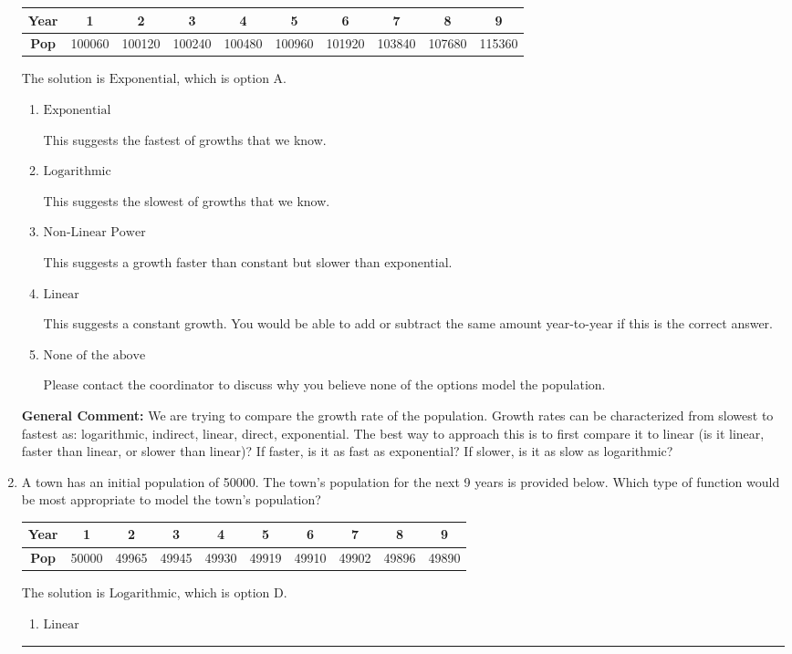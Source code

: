 \documentclass{extbook}[14pt]
\newcommand{\litem}[1]{\item #1

\rule{\textwidth}{0.4pt}}
\begin{document}
\begin{enumerate}
{\begin{tabular}{c|c|c|c|c|c|c|c|c|c}
\textbf{Year} &1 &2 &3 &4 &5 &6 &7 &8 &9\tabularnewline \hline
\textbf{Pop} &100060 &100120 &100240 &100480 &100960 &101920 &103840 &107680 &115360\end{tabular}The solution is \( \text{Exponential} \), which is option A.\begin{enumerate}[label=\Alph*.]
\item \( \text{Exponential} \)

This suggests the fastest of growths that we know.
\item \( \text{Logarithmic} \)

This suggests the slowest of growths that we know.
\item \( \text{Non-Linear Power} \)

This suggests a growth faster than constant but slower than exponential.
\item \( \text{Linear} \)

This suggests a constant growth. You would be able to add or subtract the same amount year-to-year if this is the correct answer.
\item \( \text{None of the above} \)

Please contact the coordinator to discuss why you believe none of the options model the population.
\end{enumerate}

\textbf{General Comment:} We are trying to compare the growth rate of the population. Growth rates can be characterized from slowest to fastest as: logarithmic, indirect, linear, direct, exponential. The best way to approach this is to first compare it to linear (is it linear, faster than linear, or slower than linear)? If faster, is it as fast as exponential? If slower, is it as slow as logarithmic?
}
\litem{
A town has an initial population of 50000. The town's population for the next 9 years is provided below. Which type of function would be most appropriate to model the town's population?


\begin{tabular}{c|c|c|c|c|c|c|c|c|c}
\textbf{Year} &1 &2 &3 &4 &5 &6 &7 &8 &9\tabularnewline \hline
\textbf{Pop} &50000 &49965 &49945 &49930 &49919 &49910 &49902 &49896 &49890\end{tabular}The solution is \( \text{Logarithmic} \), which is option D.\begin{enumerate}[label=\Alph*.]
\item \( \text{Linear} \)


\end{enumerate}}
\end{enumerate}
\end{document}
